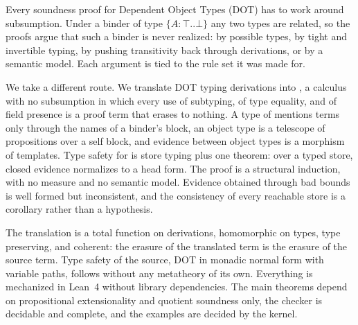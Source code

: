 Every soundness proof for Dependent Object Types (DOT) has to work around subsumption. Under a binder of type $\{A : \top..\bot\}$ any two types are related, so the proofs argue that such a binder is never realized: by possible types, by tight and invertible typing, by pushing transitivity back through derivations, or by a semantic model. Each argument is tied to the rule set it was made for.

We take a different route. We translate DOT typing derivations into \FCdot, a calculus with no subsumption in which every use of subtyping, of type equality, and of field presence is a proof term that erases to nothing. A type of \FCdot mentions terms only through the names of a binder's block, an object type is a telescope of propositions over a self block, and evidence between object types is a morphism of templates. Type safety for \FCdot is store typing plus one theorem: over a typed store, closed evidence normalizes to a head form. The proof is a structural induction, with no measure and no semantic model. Evidence obtained through bad bounds is well formed but inconsistent, and the consistency of every reachable store is a corollary rather than a hypothesis.

The translation is a total function on derivations, homomorphic on types, type preserving, and coherent: the erasure of the translated term is the erasure of the source term. Type safety of the source, DOT in monadic normal form with variable paths, follows without any metatheory of its own. Everything is mechanized in Lean~4 without library dependencies. The main theorems depend on propositional extensionality and quotient soundness only, the checker is decidable and complete, and the examples are decided by the kernel.
